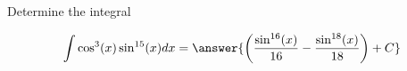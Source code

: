 \documentclass{ximera}
\author{Jason Miller}
\begin{document}
\begin{exercise}
Determine the integral

\[
\int \cos^{3}(x)\sin^{15}(x) dx= \answer{ \left( \frac{ \sin^{16}(x)}{16} - \frac{ \sin^{18}(x) }{18} \right) +C }
\]


\end{exercise}
\end{document}

